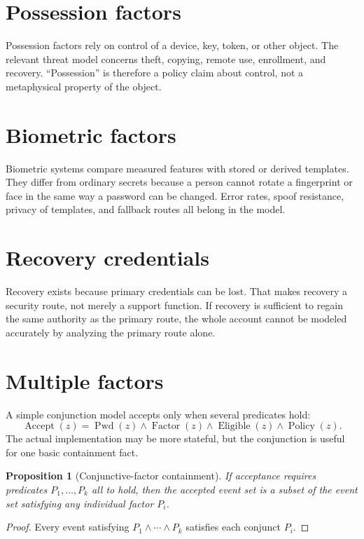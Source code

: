 \documentclass[11pt,oneside]{book}
\newtheorem{proposition}[theorem]{Proposition}
\theoremstyle{definition}
\theoremstyle{remark}
\begin{document}
\section{Possession factors}
Possession factors rely on control of a device, key, token, or other object. The relevant threat model concerns theft, copying, remote use, enrollment, and recovery. ``Possession'' is therefore a policy claim about control, not a metaphysical property of the object.

\section{Biometric factors}
Biometric systems compare measured features with stored or derived templates. They differ from ordinary secrets because a person cannot rotate a fingerprint or face in the same way a password can be changed. Error rates, spoof resistance, privacy of templates, and fallback routes all belong in the model.

\section{Recovery credentials}
Recovery exists because primary credentials can be lost. That makes recovery a security route, not merely a support function. If recovery is sufficient to regain the same authority as the primary route, the whole account cannot be modeled accurately by analyzing the primary route alone.

\section{Multiple factors}
A simple conjunction model accepts only when several predicates hold:
\[
\operatorname{Accept}(z)=\operatorname{Pwd}(z)\land\operatorname{Factor}(z)\land\operatorname{Eligible}(z)\land\operatorname{Policy}(z).
\]
The actual implementation may be more stateful, but the conjunction is useful for one basic containment fact.

\begin{proposition}[Conjunctive-factor containment]
If acceptance requires predicates $P_1,\ldots,P_k$ all to hold, then the accepted event set is a subset of the event set satisfying any individual factor $P_i$.
\end{proposition}

\begin{proof}
Every event satisfying $P_1\land\cdots\land P_k$ satisfies each conjunct $P_i$.
\end{proof}
\end{document}
